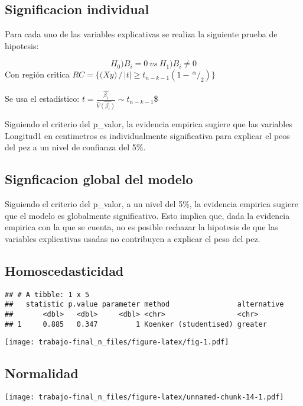 \documentclass[
]{article}
\begin{document}
\subsection{Significacion individual}\label{significacion-individual}

Para cada uno de las variables explicativas se realiza la siguiente
prueba de hipotesis:

\[H_0) B_{i} = 0\ vs\ H_1) B_{i} \neq 0\] Con región critica
\(RC = \Big\{ \Big({X}{y}\Big) \, \Big/ \, |t| \geq t_{n-k-1} (1 - \, ^\alpha\!/_2) \Big\}\)

Se usa el estadístico:
\(t=\frac{\hat{\beta_i}}{\hat{V}\hat{(\beta_i)}}  \sim t_{n-k-1}\)\$

Siguiendo el criterio del p\_valor, la evidencia empirica sugiere que
las variables Longitud1 en centimetros es individualmente significativa
para explicar el peos del pez a un nivel de confianza del 5\%.

\subsection{Signficacion global del
modelo}\label{signficacion-global-del-modelo}

Siguiendo el criterio del p\_valor, a un nivel del 5\%, la evidencia
empirica sugiere que el modelo es globalmente significativo. Esto
implica que, dada la evidencia empirica con la que se cuenta, no es
posible rechazar la hipotesis de que las variables explicativas usadas
no contribuyen a explicar el peso del pez.

\subsection{Homoscedasticidad}\label{homoscedasticidad-2}

\begin{verbatim}
## # A tibble: 1 x 5
##   statistic p.value parameter method                alternative
##       <dbl>   <dbl>     <dbl> <chr>                 <chr>      
## 1     0.885   0.347         1 Koenker (studentised) greater
\end{verbatim}

\texttt{[image: trabajo-final\_n\_files/figure-latex/fig-1.pdf]}

\subsection{Normalidad}\label{normalidad-2}

\texttt{[image: trabajo-final\_n\_files/figure-latex/unnamed-chunk-14-1.pdf]}
\end{document}
